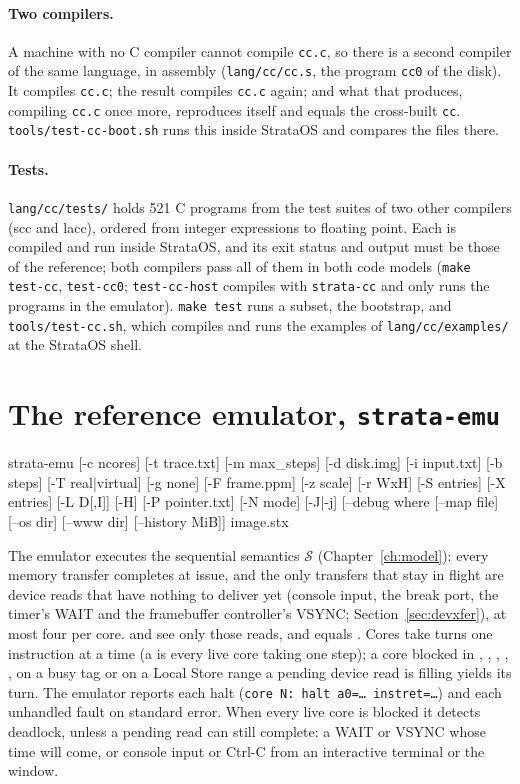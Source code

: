 \paragraph{Two compilers.} A machine with no C compiler cannot compile \texttt{cc.c}, so there is a
second compiler of the same language, in \IS assembly (\texttt{lang/cc/cc.s}, the program \texttt{cc0}
of the disk). It compiles \texttt{cc.c}; the result compiles \texttt{cc.c} again; and what that
produces, compiling \texttt{cc.c} once more, reproduces itself and equals the cross-built \texttt{cc}.
\texttt{tools/test-cc-boot.sh} runs this inside StrataOS and compares the files there.

\paragraph{Tests.} \texttt{lang/cc/tests/} holds 521 C programs from the test suites of two other
compilers (scc and lacc), ordered from integer expressions to floating point. Each is compiled and run
inside StrataOS, and its exit status and output must be those of the reference; both compilers pass
all of them in both code models (\texttt{make test-cc}, \texttt{test-cc0}; \texttt{test-cc-host}
compiles with \texttt{strata-cc} and only runs the programs in the emulator). \texttt{make test} runs a
subset, the bootstrap, and \texttt{tools/test-cc.sh}, which compiles and runs the examples of
\texttt{lang/cc/examples/} at the StrataOS shell.

\section{The reference emulator, \texttt{strata-emu}}\label{sec:emu}

\begin{shell}
strata-emu [-c ncores] [-t trace.txt] [-m max_steps] [-d disk.img] [-i input.txt]
           [-b steps] [-T real|virtual] [-g none] [-F frame.ppm] [-z scale]
           [-r WxH] [-S entries] [-X entries] [-L D[,I]] [-H] [-P pointer.txt] [-N mode] [-J|-j]
           [--debug where [--map file] [--os dir] [--www dir] [--history MiB]] image.stx
\end{shell}

The emulator executes the sequential semantics $\mathcal{S}$ (Chapter~\ref{ch:model}): every memory
transfer completes at issue, and the only transfers that stay in flight are device reads that have
nothing to deliver yet (console input, the break port, the timer's WAIT and the framebuffer
controller's VSYNC; Section~\ref{sec:devxfer}), at most four per core.  and 
see only those reads, and  equals . Cores take turns one instruction at a time
(a  is every live core taking one step); a core blocked in , ,
, , , on a busy tag or on a Local Store range a pending device read
is filling yields its turn. The emulator reports each halt (\texttt{core N: halt a0=\ldots
instret=\ldots}) and each unhandled fault on standard error. When every live core is blocked it
detects deadlock, unless a pending read can still complete: a WAIT or VSYNC whose time will come, or
console input or Ctrl-C from an interactive terminal or the window.


